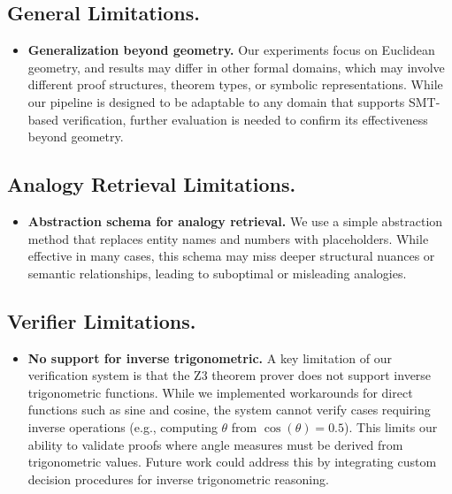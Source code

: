 

\subsection*{General Limitations.}
\begin{itemize}
\item \textbf{Generalization beyond geometry.}
Our experiments focus on Euclidean geometry, and results may differ in other formal domains, which may involve different proof structures, theorem types, or symbolic representations.
While our pipeline is designed to be adaptable to any domain that supports SMT-based verification, further evaluation is needed to confirm its effectiveness beyond geometry.
\end{itemize}



\subsection*{Analogy Retrieval Limitations.}

\begin{itemize}

    \item \textbf{Abstraction schema for analogy retrieval.} 
    We use a simple abstraction method that replaces entity names and numbers with placeholders. 
    While effective in many cases, this schema may miss deeper structural nuances or semantic relationships, leading to suboptimal or misleading analogies. 
\end{itemize}

    


\subsection*{Verifier Limitations.}

\begin{itemize}
    \item \textbf{No support for inverse trigonometric.}
    A key limitation of our verification system is that the Z3 theorem prover does not support inverse trigonometric functions. While we implemented workarounds for direct functions such as sine and cosine, the system cannot verify cases requiring inverse operations (e.g., computing $\theta$ from $\cos(\theta) = 0.5$). This limits our ability to validate proofs where angle measures must be derived from trigonometric values. Future work could address this by integrating custom decision procedures for inverse trigonometric reasoning.
\end{itemize}

